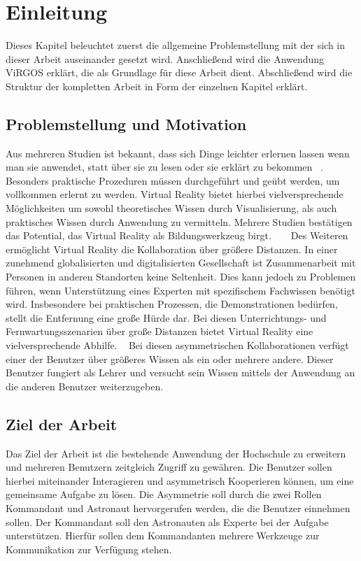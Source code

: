 \section{Einleitung}
Dieses Kapitel beleuchtet zuerst die allgemeine Problemstellung mit der sich in dieser Arbeit auseinander gesetzt wird. Anschließend wird die Anwendung ViRGOS erklärt, die als Grundlage für diese Arbeit dient. Abschließend wird die Struktur der kompletten Arbeit in Form der einzelnen Kapitel erklärt.

\subsection{Problemstellung und Motivation} \label{Problemstellung}

Aus mehreren Studien ist bekannt, dass sich Dinge leichter erlernen lassen wenn man sie anwendet, statt über sie zu lesen oder sie erklärt zu bekommen ~\parencite{steffens}. Besonders praktische Prozeduren müssen durchgeführt und geübt werden, um vollkommen erlernt zu werden. Virtual Reality bietet hierbei vielversprechende Möglichkeiten um sowohl theoretisches Wissen durch Visualisierung, als auch praktisches Wissen durch Anwendung zu vermitteln. Mehrere Studien bestätigen das Potential, das Virtual Reality als Bildungswerkzeug birgt. ~\parencite{8864531} ~\parencite{8797755} Des Weiteren ermöglicht Virtual Reality die Kollaboration über größere Distanzen. In einer zunehmend globalisierten und digitalisierten Gesellschaft ist Zusammenarbeit mit Personen in anderen Standorten keine Seltenheit. Dies kann jedoch zu Problemen führen, wenn Unterstützung eines Experten mit spezifischem Fachwissen benötigt wird. Insbesondere bei praktischen Prozessen, die Demonstrationen bedürfen, stellt die Entfernung eine große Hürde dar. Bei diesen Unterrichtungs- und Fernwartungsszenarien über große Distanzen bietet Virtual Reality eine vielversprechende Abhilfe. ~\parencite{10.1145/2807442.2807497} Bei diesen asymmetrischen Kollaborationen verfügt einer der Benutzer über größeres Wissen als ein oder mehrere andere. Dieser Benutzer fungiert als Lehrer und versucht sein Wissen mittels der Anwendung an die anderen Benutzer weiterzugeben. \\ 
\newpage

\subsection{Ziel der Arbeit}

Das Ziel der Arbeit ist die bestehende Anwendung der Hochschule zu erweitern und mehreren Benutzern zeitgleich Zugriff zu gewähren. Die Benutzer sollen hierbei miteinander Interagieren und asymmetrisch Kooperieren können, um eine gemeinsame Aufgabe zu lösen. Die Asymmetrie soll durch die zwei Rollen Kommandant und Astronaut hervorgerufen werden, die die Benutzer einnehmen sollen. Der Kommandant soll den Astronauten als Experte bei der Aufgabe unterstützen. Hierfür sollen dem Kommandanten mehrere Werkzeuge zur Kommunikation zur Verfügung stehen. \\

